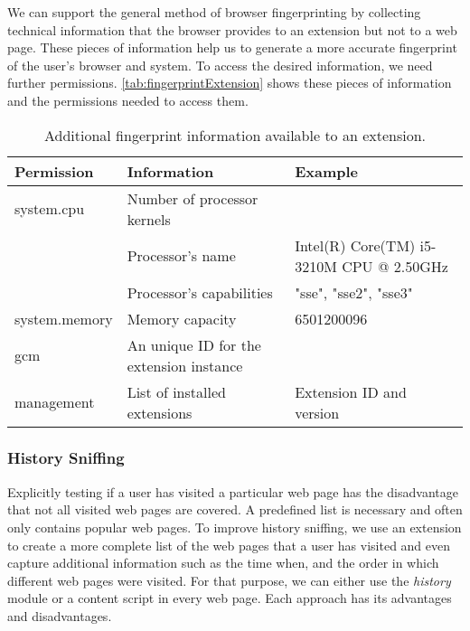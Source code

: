 	We can support the general method of browser fingerprinting by collecting technical information that the browser provides to an extension but not to a web page. These pieces of information help us to generate a more accurate fingerprint of the user's browser and system. To access the desired information, we need further permissions. \autoref{tab:fingerprintExtension} shows these pieces of information and the permissions needed to access them. 
	
	\begin{table}[h]
		\begin{tabular}{|l|l|l|} \hline
			\textbf{Permission} & \textbf{Information} & \textbf{Example} \\ \hline
			system.cpu & Number of processor kernels & \\
			& Processor's name & Intel(R) Core(TM) i5-3210M CPU @ 2.50GHz \\
			& Processor's capabilities & "sse", "sse2", "sse3"  \\ \hline
			system.memory & Memory capacity & 6501200096 \\ \hline
			gcm & An unique ID for the extension instance & \\ \hline
			management & List of installed extensions & Extension ID and version \\ \hline
		\end{tabular}
		\caption{Additional fingerprint information available to an extension.}
		\label{tab:fingerprintExtension}
	\end{table} 
	
\subsubsection{History Sniffing}

	Explicitly testing if a user has visited a particular web page has the disadvantage that not all visited web pages are covered. A predefined list is necessary and often only contains popular web pages. To improve history sniffing, we use an extension to create a more complete list of the web pages that a user has visited and even capture additional information such as the time when, and the order in which different web pages were visited. For that purpose, we can either use the \textit{history} module or a content script in every web page. Each approach has its advantages and disadvantages. 
	
